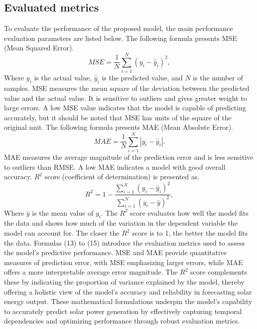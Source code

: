 \documentclass[sn-mathphys-num]{sn-jnl}%
\begin{document}
\subsection{Evaluated metrics}
To evaluate the performance of the proposed model, the main performance evaluation parameters are listed below. 
The following formula presents MSE (Mean Squared Error). 
\begin{equation}
MSE = \frac{1}{N} \sum_{i=1}^{N}(y_i - \hat{y}_i)^2,
\end{equation}
Where $y_i$ is the actual value, $\hat{y}_i$ is the predicted value, and $N$ is the number of samples. MSE measures the mean square of the deviation between the predicted value and the actual value. It is sensitive to outliers and gives greater weight to large errors. A low MSE value indicates that the model is capable of predicting accurately, but it should be noted that MSE has units of the square of the original unit. The following formula presents MAE (Mean Absolute Error).
   \begin{equation}
   MAE = \frac{1}{N} \sum_{i=1}^{N} |y_i - \hat{y}_i|.
   \end{equation}
  MAE measures the average magnitude of the prediction error and is less sensitive to outliers than RMSE. A low MAE indicates a model with good overall accuracy. $R^2$ score (coefficient of determination) is presented as.
   \begin{equation}
   R^2 = 1 - \frac{\sum_{i=1}^{N} (y_i - \hat{y}_i)^2}{\sum_{i=1}^{N} (y_i - \bar{y})^2},
   \end{equation}
  Where $\bar{y}$ is the mean value of $y_i$. The $R^2$ score evaluates how well the model fits the data and shows how much of the variation in the dependent variable the model can account for. The closer the $R^2$ score is to 1, the better the model fits the data.
Formulas (13) to (15) introduce the evaluation metrics used to assess the model’s predictive performance. MSE and MAE provide quantitative measures of prediction error, with MSE emphasizing larger errors, while MAE offers a more interpretable average error magnitude. The \( R^2 \) score complements these by indicating the proportion of variance explained by the model, thereby offering a holistic view of the model’s accuracy and reliability in forecasting solar energy output. These mathematical formulations underpin the model’s capability to accurately predict solar power generation by effectively capturing temporal dependencies and optimizing performance through robust evaluation metrics.
\end{document}
